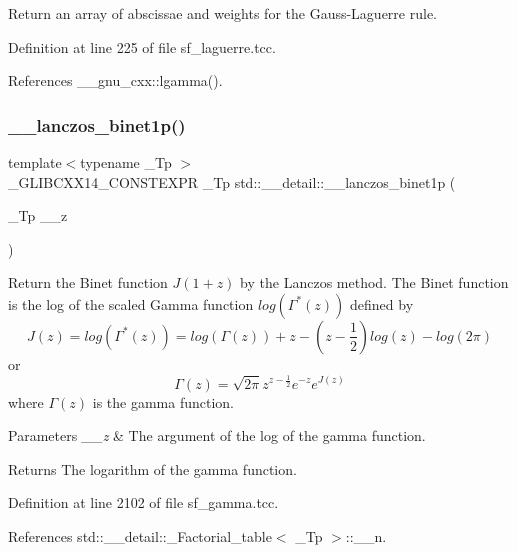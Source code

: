 Return an array of abscissae and weights for the Gauss-\/\+Laguerre rule. 

Definition at line 225 of file sf\+\_\+laguerre.\+tcc.



References \+\_\+\+\_\+gnu\+\_\+cxx\+::lgamma().

\mbox{\label{namespacestd_1_1____detail_a84722b82d6d614aa4653eb7559f7d508}} 
\subsubsection{\texorpdfstring{\+\_\+\+\_\+lanczos\+\_\+binet1p()}{\_\_lanczos\_binet1p()}}
{\footnotesize\ttfamily template$<$typename \+\_\+\+Tp $>$ \\
\+\_\+\+G\+L\+I\+B\+C\+X\+X14\+\_\+\+C\+O\+N\+S\+T\+E\+X\+PR \+\_\+\+Tp std\+::\+\_\+\+\_\+detail\+::\+\_\+\+\_\+lanczos\+\_\+binet1p (\begin{DoxyParamCaption}\item[{\+\_\+\+Tp}]{\+\_\+\+\_\+z }\end{DoxyParamCaption})}



Return the Binet function $ J(1+z) $ by the Lanczos method. The Binet function is the log of the scaled Gamma function $ log(\Gamma^*(z)) $ defined by \[ J(z) = log(\Gamma^*(z)) = log\left(\Gamma(z)\right) + z - \left(z-\frac{1}{2}\right) log(z) - log(2\pi) \] or \[ \Gamma(z) = \sqrt{2\pi}z^{z-\frac{1}{2}}e^{-z}e^{J(z)} \] where $ \Gamma(z) $ is the gamma function. 


\begin{DoxyParams}{Parameters}
{\em \+\_\+\+\_\+z} & The argument of the log of the gamma function. \\
\hline
\end{DoxyParams}
\begin{DoxyReturn}{Returns}
The logarithm of the gamma function. 
\end{DoxyReturn}


Definition at line 2102 of file sf\+\_\+gamma.\+tcc.



References std\+::\+\_\+\+\_\+detail\+::\+\_\+\+Factorial\+\_\+table$<$ \+\_\+\+Tp $>$\+::\+\_\+\+\_\+n.



